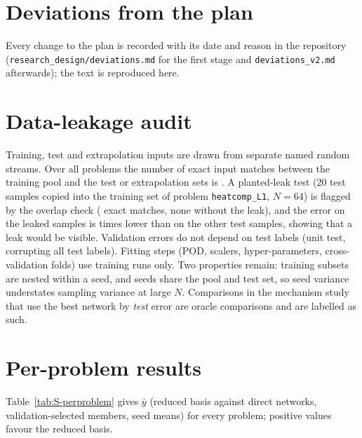 \documentclass[preprint,11pt]{elsarticle}
\begin{document}
\section{Deviations from the plan}\label{sec:S-deviations}
Every change to the plan is recorded with its date and reason in the repository (\texttt{research\_design/deviations.md} for the first stage and \texttt{deviations\_v2.md} afterwards); the text is reproduced here.


\section{Data-leakage audit}\label{sec:S-leak}
Training, test and extrapolation inputs are drawn from separate named random streams. Over all \NAllProblems{} problems the number of exact input matches between the training pool and the test or extrapolation sets is \LeakMaxMatches. A planted-leak test (20 test samples copied into the training set of problem \texttt{heatcomp\_L1}, $N=64$) is flagged by the overlap check (\LeakPlantedFlagged{} exact matches, none without the leak), and the error on the leaked samples is \LeakErrorRatio{} times lower than on the other test samples, showing that a leak would be visible. Validation errors do not depend on test labels (unit test, corrupting all test labels). Fitting steps (POD, scalers, hyper-parameters, cross-validation folds) use training runs only. Two properties remain: training subsets are nested within a seed, and seeds share the pool and test set, so seed variance understates sampling variance at large $N$. Comparisons in the mechanism study that use the best network by \emph{test} error are oracle comparisons and are labelled as such.

\section{Per-problem results}\label{sec:S-perproblem}
Table~\ref{tab:S-perproblem} gives $\bar y$ (reduced basis against direct networks, validation-selected members, seed means) for every problem; positive values favour the reduced basis.
{\footnotesize}
\end{document}
